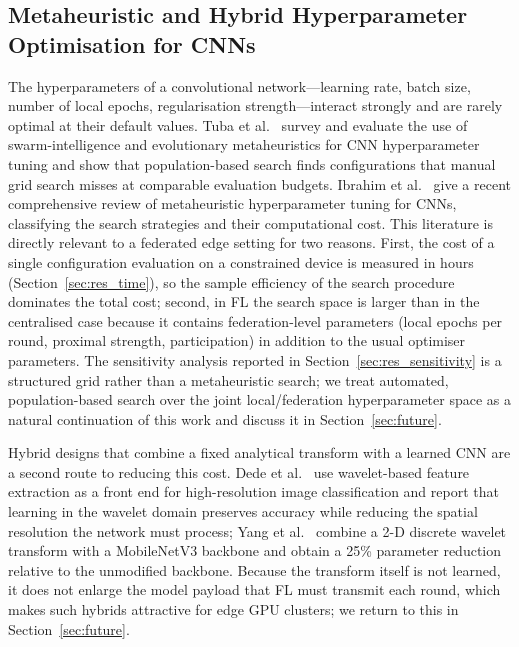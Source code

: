 \documentclass[journal]{IEEEtran}
\begin{document}
\subsection{Metaheuristic and Hybrid Hyperparameter Optimisation for CNNs}
\label{sec:related_meta}

The hyperparameters of a convolutional network---learning rate, batch size, number of local epochs, regularisation strength---interact strongly and are rarely optimal at their default values. Tuba et al.~\cite{tuba2021cnnhyper} survey and evaluate the use of swarm-intelligence and evolutionary metaheuristics for CNN hyperparameter tuning and show that population-based search finds configurations that manual grid search misses at comparable evaluation budgets. Ibrahim et al.~\cite{ibrahim2025metaheuristiccnn} give a recent comprehensive review of metaheuristic hyperparameter tuning for CNNs, classifying the search strategies and their computational cost. This literature is directly relevant to a federated edge setting for two reasons. First, the cost of a single configuration evaluation on a constrained device is measured in hours (Section~\ref{sec:res_time}), so the sample efficiency of the search procedure dominates the total cost; second, in FL the search space is larger than in the centralised case because it contains federation-level parameters (local epochs per round, proximal strength, participation) in addition to the usual optimiser parameters. The sensitivity analysis reported in Section~\ref{sec:res_sensitivity} is a structured grid rather than a metaheuristic search; we treat automated, population-based search over the joint local/federation hyperparameter space as a natural continuation of this work and discuss it in Section~\ref{sec:future}.

Hybrid designs that combine a fixed analytical transform with a learned CNN are a second route to reducing this cost. Dede et al.~\cite{dede2025wavelet} use wavelet-based feature extraction as a front end for high-resolution image classification and report that learning in the wavelet domain preserves accuracy while reducing the spatial resolution the network must process; Yang et al.~\cite{yang2025wavelitenet} combine a 2-D discrete wavelet transform with a MobileNetV3 backbone and obtain a 25\% parameter reduction relative to the unmodified backbone. Because the transform itself is not learned, it does not enlarge the model payload that FL must transmit each round, which makes such hybrids attractive for edge GPU clusters; we return to this in Section~\ref{sec:future}.
\end{document}
